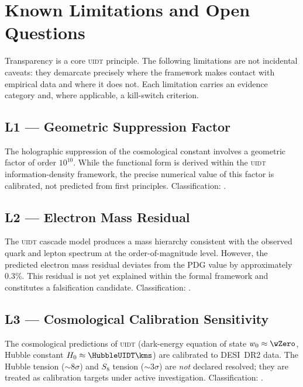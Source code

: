 %
\section{Known Limitations and Open Questions}
\label{sec:limitations}

\noindent
Transparency is a core \textsc{uidt} principle. The following limitations
are not incidental caveats: they demarcate precisely where the framework
makes contact with empirical data and where it does not. Each limitation
carries an evidence category and, where applicable, a kill-switch criterion.

\subsection{L1 --- Geometric Suppression Factor}
\label{lim:L1}
\begin{limitation}
The holographic suppression of the cosmological constant involves a
geometric factor of order $10^{10}$. While the functional form is derived
within the \textsc{uidt} information-density framework, the precise
numerical value of this factor is calibrated, not predicted from first
principles. Classification: \evC{}.
\end{limitation}

\subsection{L2 --- Electron Mass Residual}
\label{lim:L2}
\begin{limitation}
The \textsc{uidt} cascade model produces a mass hierarchy consistent with
the observed quark and lepton spectrum at the order-of-magnitude level.
However, the predicted electron mass residual deviates from the PDG value
by approximately $0.3\%$. This residual is not yet explained within the
formal framework and constitutes a falsification candidate.
Classification: \evD{}.
\end{limitation}

\subsection{L3 --- Cosmological Calibration Sensitivity}
\label{lim:L3}
\begin{limitation}
The cosmological predictions of \textsc{uidt} (dark-energy equation of
state $w_0 \approx \wZero$, Hubble constant $H_0 \approx \HubbleUIDT\kms$)
are calibrated to DESI~DR2 data. The Hubble tension ($\sim 8\sigma$) and
$S_8$ tension ($\sim 3\sigma$) are \emph{not} declared resolved;
they are treated as calibration targets under active investigation.
Classification: \evC{}.
\end{limitation}

